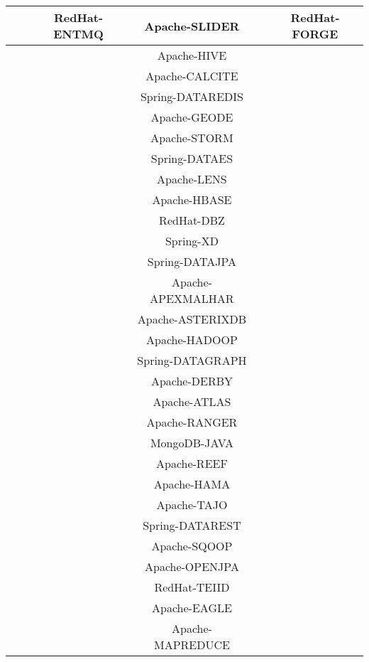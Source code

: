 \begin{tabular}{|c|c|c|c|c|c|}
\hline
 &  & RedHat-ENTMQ & Apache-SLIDER &  & RedHat-FORGE\\
\hline
 &  &  & Apache-HIVE &  & \\
\hline
 &  &  & Apache-CALCITE &  & \\
\hline
 &  &  & Spring-DATAREDIS &  & \\
\hline
 &  &  & Apache-GEODE &  & \\
\hline
 &  &  & Apache-STORM &  & \\
\hline
 &  &  & Spring-DATAES &  & \\
\hline
 &  &  & Apache-LENS &  & \\
\hline
 &  &  & Apache-HBASE &  & \\
\hline
 &  &  & RedHat-DBZ &  & \\
\hline
 &  &  & Spring-XD &  & \\
\hline
 &  &  & Spring-DATAJPA &  & \\
\hline
 &  &  & Apache-APEXMALHAR &  & \\
\hline
 &  &  & Apache-ASTERIXDB &  & \\
\hline
 &  &  & Apache-HADOOP &  & \\
\hline
 &  &  & Spring-DATAGRAPH &  & \\
\hline
 &  &  & Apache-DERBY &  & \\
\hline
 &  &  & Apache-ATLAS &  & \\
\hline
 &  &  & Apache-RANGER &  & \\
\hline
 &  &  & MongoDB-JAVA &  & \\
\hline
 &  &  & Apache-REEF &  & \\
\hline
 &  &  & Apache-HAMA &  & \\
\hline
 &  &  & Apache-TAJO &  & \\
\hline
 &  &  & Spring-DATAREST &  & \\
\hline
 &  &  & Apache-SQOOP &  & \\
\hline
 &  &  & Apache-OPENJPA &  & \\
\hline
 &  &  & RedHat-TEIID &  & \\
\hline
 &  &  & Apache-EAGLE &  & \\
\hline
 &  &  & Apache-MAPREDUCE &  & \\
\hline
\end{tabular}